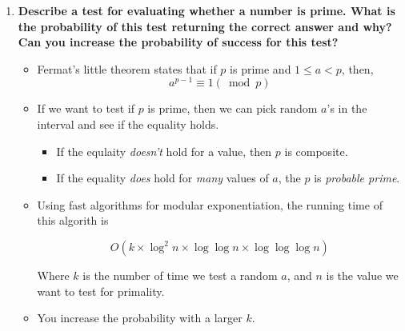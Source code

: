 \documentclass[a4paper,11pt]{article}
\begin{document}
\begin{enumerate}
\def\labelenumi{\arabic{enumi}.}
\itemsep1pt\parskip0pt
\item
  \textbf{Describe a test for evaluating whether a number is prime. What
  is the probability of this test returning the correct answer and why?
  Can you increase the probability of success for this test?}

  \begin{itemize}
  \item
    Fermat's little theorem states that if $p$ is prime and
    $1 \le a < p$, then, \[a^{p - 1} \equiv 1 (\bmod p)\]
  \item
    If we want to test if $p$ is prime, then we can pick random $a$'s in
    the interval and see if the equality holds.

    \begin{itemize}
    \itemsep1pt\parskip0pt
    \item
      If the equlaity \emph{doesn't} hold for a value, then $p$ is
      composite.
    \item
      If the equality \emph{does} hold for \emph{many} values of $a$,
      the $p$ is \emph{probable prime}.
    \end{itemize}
  \item
    Using fast algorithms for modular exponentiation, the running time
    of this algorith is

    \[O(k \times \log^2 n \times \log \log n \times \log \log \log n)\]

    Where $k$ is the number of time we test a random $a$, and $n$ is the
    value we want to test for primality.
  \item
    You increase the probability with a larger $k$.
  \end{itemize}
\end{enumerate}
\end{document}
